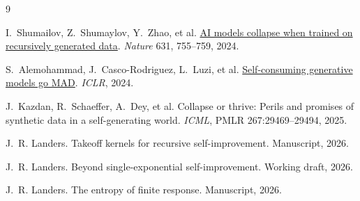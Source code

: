 \documentclass[10pt]{article}
\begin{document}
\begin{thebibliography}{9}\scriptsize
\setlength{\parskip}{0pt}

I.~Shumailov, Z.~Shumaylov, Y.~Zhao, et al.
\newblock \href{https://doi.org/10.1038/s41586-024-07566-y}{AI models collapse when trained on recursively generated data}.
\newblock \emph{Nature} 631, 755--759, 2024.

S.~Alemohammad, J.~Casco-Rodriguez, L.~Luzi, et al.
\newblock \href{https://openreview.net/forum?id=ShjMHfmPs0}{Self-consuming generative models go MAD}. \emph{ICLR}, 2024.

J.~Kazdan, R.~Schaeffer, A.~Dey, et al.
\newblock Collapse or thrive: Perils and promises of synthetic data in a self-generating world.
\newblock \emph{ICML}, PMLR 267:29469--29494, 2025.

J.~R. Landers.
\newblock Takeoff kernels for recursive self-improvement.
\newblock Manuscript, 2026.

J.~R. Landers.
\newblock Beyond single-exponential self-improvement.
\newblock Working draft, 2026.

J.~R. Landers.
\newblock The entropy of finite response.
\newblock Manuscript, 2026.

\end{thebibliography}
\end{document}
